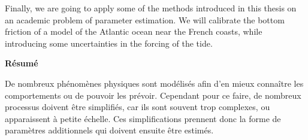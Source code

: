 Finally, we are going to apply some of the methods introduced in this
thesis on an academic problem of parameter estimation. We will
calibrate the bottom friction of a model of the Atlantic ocean near
the French coasts, while introducing some uncertainties in the forcing
of the tide.



%
%
%

\vspace{0.5cm}
\etoile
\vspace{0.5cm}
\begin{center}
  \bf Résumé
\end{center}
\vspace{0.3cm}

De nombreux phénomènes physiques sont modélisés afin
d'en mieux connaître les comportements ou de pouvoir les
prévoir. Cependant pour ce faire, de nombreux processus doivent être
simplifiés, car ils sont souvent trop complexes, ou apparaissent à
petite échelle. Ces simplifications prennent donc la forme de
paramètres additionnels qui doivent ensuite être estimés.

